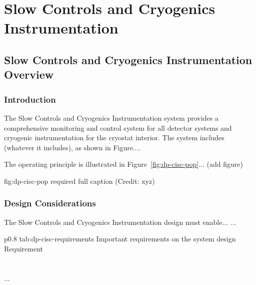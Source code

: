 \chapter{Slow Controls and Cryogenics Instrumentation}
\label{ch:fddp-slow-cryo}

\section{Slow Controls and Cryogenics Instrumentation Overview}
\label{sec:fddp-slow-cryo-ov}


\subsection{Introduction}
\label{sec:fddp-slow-cryo-intro}

The Slow Controls and Cryogenics Instrumentation system provides a
comprehensive monitoring and control system for all detector systems
and cryogenic instrumentation for the cryostat interior.
The system includes (whatever it includes), as shown in Figure.... 


The operating principle is illustrated in Figure~\ref{fig:dp-cisc-pop}... (add figure)

\begin{dunefigure}{fig:dp-cisc-pop}
{required full caption (Credit: xyz)}
\end{dunefigure}

\subsection{Design Considerations}
\label{sec:fddp-slow-cryo-des-consid}


The Slow Controls and Cryogenics Instrumentation design must enable... 
...


\begin{dunetable}
{p{0.8\textwidth}}
{tab:dp-cisc-requirements}
{Important requirements on the system design}   
Requirement  \\ \toprowrule
  \\ \colhline
   \\ \colhline
 ...\\ 
\end{dunetable}

